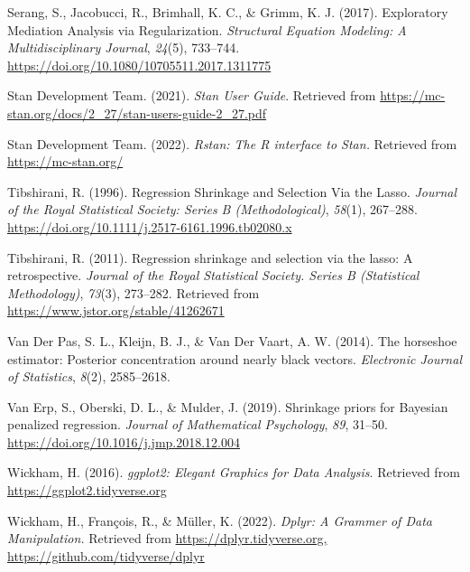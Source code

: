 \documentclass[
  man, donotrepeattitle,floatsintext]{apa6}
\newlength{\cslhangindent}
\newlength{\cslentryspacingunit} %
\newenvironment{CSLReferences}[2] %
 {%
  \setlength{\parindent}{0pt}
  \ifodd #1
  \let\oldpar\par
  \def\par{\hangindent=\cslhangindent\oldpar}
  \fi
  \setlength{\parskip}{#2\cslentryspacingunit}
 }%
 {}
\begin{document}
\begin{CSLReferences}{1}{0}
\leavevmode{}%
Serang, S., Jacobucci, R., Brimhall, K. C., \& Grimm, K. J. (2017). Exploratory {Mediation} {Analysis} via {Regularization}. \emph{Structural Equation Modeling: A Multidisciplinary Journal}, \emph{24}(5), 733--744. \url{https://doi.org/10.1080/10705511.2017.1311775}

\leavevmode{}%
Stan Development Team. (2021). \emph{Stan {User} {Guide}}. Retrieved from \url{https://mc-stan.org/docs/2_27/stan-users-guide-2_27.pdf}

\leavevmode{}%
Stan Development Team. (2022). \emph{Rstan: The {R} interface to {Stan}.} Retrieved from \url{https://mc-stan.org/}

\leavevmode{}%
Tibshirani, R. (1996). Regression {Shrinkage} and {Selection} {Via} the {Lasso}. \emph{Journal of the Royal Statistical Society: Series B (Methodological)}, \emph{58}(1), 267--288. \url{https://doi.org/10.1111/j.2517-6161.1996.tb02080.x}

\leavevmode{}%
Tibshirani, R. (2011). Regression shrinkage and selection via the lasso: A retrospective. \emph{Journal of the Royal Statistical Society. Series B (Statistical Methodology)}, \emph{73}(3), 273--282. Retrieved from \url{https://www.jstor.org/stable/41262671}

\leavevmode{}%
Van Der Pas, S. L., Kleijn, B. J., \& Van Der Vaart, A. W. (2014). The horseshoe estimator: {Posterior} concentration around nearly black vectors. \emph{Electronic Journal of Statistics}, \emph{8}(2), 2585--2618.

\leavevmode{}%
Van Erp, S., Oberski, D. L., \& Mulder, J. (2019). Shrinkage priors for {Bayesian} penalized regression. \emph{Journal of Mathematical Psychology}, \emph{89}, 31--50. \url{https://doi.org/10.1016/j.jmp.2018.12.004}

\leavevmode{}%
Wickham, H. (2016). \emph{ggplot2: {Elegant} {Graphics} for {Data} {Analysis}}. Retrieved from \url{https://ggplot2.tidyverse.org}

\leavevmode{}%
Wickham, H., François, R., \& Müller, K. (2022). \emph{Dplyr: {A} {Grammer} of {Data} {Manipulation}.} Retrieved from \href{https://dplyr.tidyverse.org,\%20https://github.com/tidyverse/dplyr}{https://dplyr.tidyverse.org, https://github.com/tidyverse/dplyr}


\end{CSLReferences}
\end{document}
